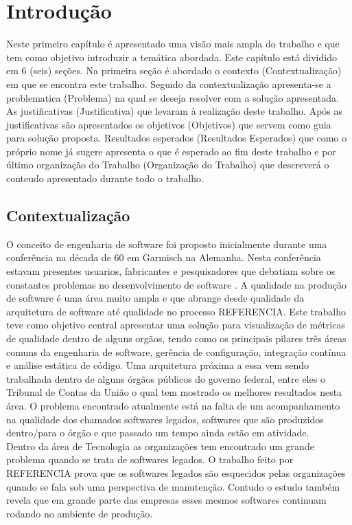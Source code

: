 \chapter[Introdução]{Introdução}
	Neste primeiro capítulo é apresentado uma visão mais ampla do trabalho e que tem como objetivo introduzir a temática abordada. Este capítulo está dividido em 6 (seis) seções. Na primeira seção é abordado o contexto (Contextualização) em que se encontra este trabalho. Seguido da contextualização apresenta-se a problematica (Problema) na qual se deseja resolver com a solução apresentada. As justificativas (Justificativa) que levaram à realização deste trabalho. Após as justificativas são apresentados os objetivos (Objetivos) que servem como guia para solução proposta. Resultados esperados (Resultados Esperados) que como o próprio nome já sugere apresenta o que é esperado ao  fim deste trabalho e por último organização do Trabalho (Organização do Trabalho) que descreverá o conteudo apresentado durante todo o trabalho.


\section{Contextualização}
	O conceito de engenharia de software foi proposto inicialmente durante uma conferência na década de 60 em Garmisch na Alemanha. Nesta conferência estavam presentes usuarios, fabricantes e pesquisadores que debatiam sobre os constantes problemas no desenvolvimento de software \cite{Paduelli}.
A qualidade na produção de software é uma área muito ampla e que abrange desde qualidade da arquitetura de software até qualidade no processo REFERENCIA. Este trabalho teve como objetivo central apresentar uma solução para visualização de métricas de qualidade dentro de alguns orgãos, tendo como os principais pilares três áreas comuns da engenharia de software, gerência de configuração, integração contínua e análise estática de código. Uma arquitetura próxima a essa vem sendo trabalhada dentro de alguns órgãos públicos do governo federal, entre eles o Tribunal de Contas da União o qual tem mostrado os melhores resultados nesta área. O problema encontrado atualmente está na falta de um acompanhamento na qualidade dos chamados softwares legados, softwares que são produzidos dentro/para o órgão e que passado um tempo ainda estão em atividade.
	\\Dentro da área de Tecnologia as organizações tem encontrado um grande problema quando se trata de softwares legados. O trabalho feito por REFERENCIA prova que os softwares legados são esquecidos pelas organizações quando se fala sob uma perspectiva de manutenção. Contudo o estudo também revela que em grande parte das empresas esses mesmos softwares continuam rodando no ambiente de produção.
	

